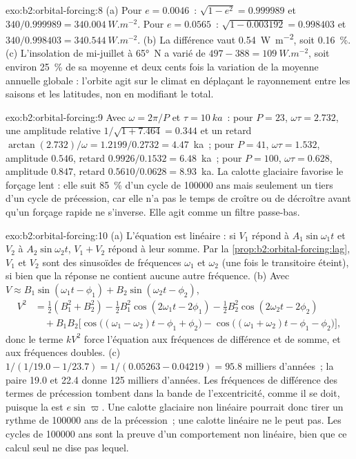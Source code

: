 \begin{solution}{exo:b2:orbital-forcing:8}
(a) Pour $e = 0.0046$~: $\sqrt{1 - e^2} = 0.999989$ et $340/0.999989 = \qty{340.004}{W.m^{-2}}$. Pour
$e = 0.0565$~: $\sqrt{1 - 0.003192} = 0.998403$ et $340/0.998403 = \qty{340.544}{W.m^{-2}}$. (b) La
différence vaut \qty{0.54}{W.m^{-2}}, soit \qty{0.16}{\percent}. (c) L'insolation de mi-juillet à \ang{65}~N
a varié de $497 - 388 = \qty{109}{W.m^{-2}}$, soit environ \qty{25}{\percent} de sa moyenne et deux cents
fois la variation de la moyenne annuelle globale : l'orbite agit sur le climat en déplaçant le rayonnement entre
les saisons et les latitudes, non en modifiant le total.
\end{solution}

\begin{solution}{exo:b2:orbital-forcing:9}
Avec $\omega = 2\pi/P$ et $\tau = \qty{10}{ka}$~: pour $P = 23$, $\omega\tau = 2.732$, une amplitude
relative $1/\sqrt{1 + 7.464} = 0.344$ et un retard $\arctan(2.732)/\omega = 1.2199/0.2732 = 4.47$~ka~;
pour $P = 41$, $\omega\tau = 1.532$, amplitude $0.546$, retard $0.9926/0.1532 = 6.48$~ka~; pour $P =
100$, $\omega\tau = 0.628$, amplitude $0.847$, retard $0.5610/0.0628 = 8.93$~ka. La calotte glaciaire
favorise le forçage lent : elle suit \qty{85}{\percent} d'un cycle de \num{100000} ans mais seulement un
tiers d'un cycle de précession, car elle n'a pas le temps de croître ou de décroître avant qu'un forçage rapide
ne s'inverse. Elle agit comme un filtre passe-bas.
\end{solution}

\begin{solution}{exo:b2:orbital-forcing:10}
(a) L'équation est linéaire : si $V_1$ répond à $A_1\sin\omega_1t$ et $V_2$ à
$A_2\sin\omega_2t$, $V_1 + V_2$ répond à leur somme. Par la \cref{prop:b2:orbital-forcing:lag}, $V_1$ et
$V_2$ sont des sinusoïdes de fréquences $\omega_1$ et $\omega_2$ (une fois le transitoire éteint), si bien que
la réponse ne contient aucune autre fréquence. (b) Avec $V \approx B_1\sin(\omega_1t - \phi_1) +
B_2\sin(\omega_2t - \phi_2)$,
\[
\begin{aligned}
  V^2 &= \tfrac12(B_1^2 + B_2^2) - \tfrac12B_1^2\cos(2\omega_1t - 2\phi_1) -
  \tfrac12B_2^2\cos(2\omega_2t - 2\phi_2)\\
  &\quad + B_1B_2\bigl[\cos\bigl((\omega_1 - \omega_2)t - \phi_1 + \phi_2\bigr) -
  \cos\bigl((\omega_1 + \omega_2)t - \phi_1 - \phi_2\bigr)\bigr],
\end{aligned}
\]
donc le terme $kV^2$ force l'équation aux fréquences de différence et de somme, et aux fréquences
doubles. (c) $1/(1/19.0 - 1/23.7) = 1/(0.05263 - 0.04219) = 95.8$ milliers d'années~; la paire 19.0
et 22.4 donne 125 milliers d'années. Les fréquences de différence des termes de précession tombent dans
la bande de l'excentricité, comme il se doit, puisque la  est $e\sin\varpi$. Une calotte glaciaire
non linéaire pourrait donc tirer un rythme de \num{100000} ans de la précession~; une calotte linéaire ne le peut pas.
Les cycles de \num{100000} ans sont la preuve d'un comportement non linéaire, bien que ce calcul seul
ne dise pas lequel.
\end{solution}

